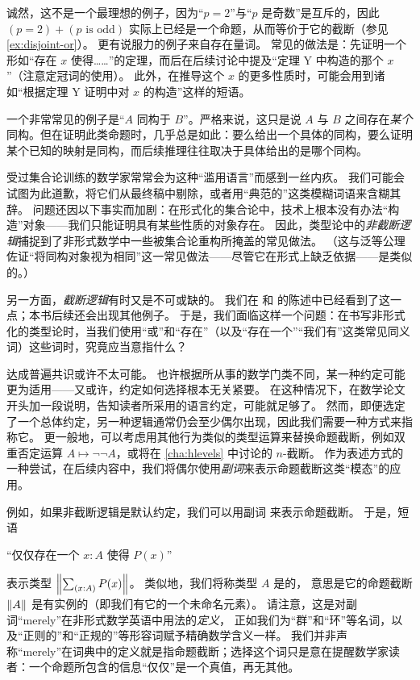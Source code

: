 诚然，这不是一个最理想的例子，因为``$p=2$''与``$p$ 是奇数''是互斥的，因此 $(p=2)+(p\text{ is odd})$ 实际上已经是一个命题，从而等价于它的截断（参见 \cref{ex:disjoint-or}）。
更有说服力的例子来自存在量词。
常见的做法是：先证明一个形如``存在 $x$ 使得……''的定理，而后在后续讨论中提及``定理 Y 中构造的那个 $x$''（注意定冠词的使用）。
此外，在推导这个 $x$ 的更多性质时，可能会用到诸如``根据定理 Y 证明中对 $x$ 的构造''这样的短语。

一个非常常见的例子是``$A$ 同构于 $B$''。严格来说，这只是说 $A$ 与 $B$ 之间存在\emph{某个}同构。但在证明此类命题时，几乎总是如此：要么给出一个具体的同构，要么证明某个已知的映射是同构，而后续推理往往取决于具体给出的是哪个同构。

受过集合论训练的数学家常常会为这种``滥用语言''而感到一丝内疚。
我们可能会试图为此道歉，将它们从最终稿中剔除，或者用``典范的''这类模糊词语来含糊其辞。
问题还因以下事实而加剧：在形式化的集合论中，技术上根本没有办法``构造''对象——我们只能证明具有某些性质的对象存在。
因此，类型论中的\emph{非截断逻辑}捕捉到了非形式数学中一些被集合论重构所掩盖的常见做法。
（这与泛等公理佐证``将同构对象视为相同''这一常见做法——尽管它在形式上缺乏依据——是类似的。）

另一方面，\emph{截断逻辑}有时又是不可或缺的。
我们在 \LEM{} 和 \choice{} 的陈述中已经看到了这一点；本书后续还会出现其他例子。
于是，我们面临这样一个问题：在书写非形式化的类型论时，当我们使用``或''和``存在''（以及``存在一个''``我们有''这类常见同义词）这些词时，究竟应当意指什么？

达成普遍共识或许不太可能。
也许根据所从事的数学门类不同，某一种约定可能更为适用——又或许，约定如何选择根本无关紧要。
在这种情况下，在数学论文开头加一段说明，告知读者所采用的语言约定，可能就足够了。
然而，即便选定了一个总体约定，另一种逻辑通常仍会至少偶尔出现，因此我们需要一种方式来指称它。
更一般地，可以考虑用其他行为类似的类型运算来替换命题截断，例如双重否定运算 $A\mapsto \neg\neg A$，或将在 \cref{cha:hlevels} 中讨论的 $n$-截断。
作为表述方式的一种尝试，在后续内容中，我们将偶尔使用\emph{副词}来表示命题截断这类``模态''的应用。

例如，如果非截断逻辑是默认约定，我们可以用副词 
%
来表示命题截断。
于是，短语

\begin{center}
  ``仅仅存在一个 $x:A$ 使得 $P(x)$''
\end{center}

表示类型 $\brck{\sm{x:A} P(x)}$。
类似地，我们将称类型 $A$ 是的，
%
%
意思是它的命题截断 $\mathopen{}\left\Vert A\right\Vert_{}\mathclose{}$ 是有实例的（即我们有它的一个未命名元素）。
请注意，这是对副词``merely''在非形式数学英语中用法的\emph{定义}，
正如我们为``群''和``环''等名词，以及``正则的''和``正规的''等形容词赋予精确数学含义一样。
我们并非声称``merely''在词典中的定义就是指命题截断；选择这个词只是意在提醒数学家读者：一个命题所包含的信息``仅仅''是一个真值，再无其他。

